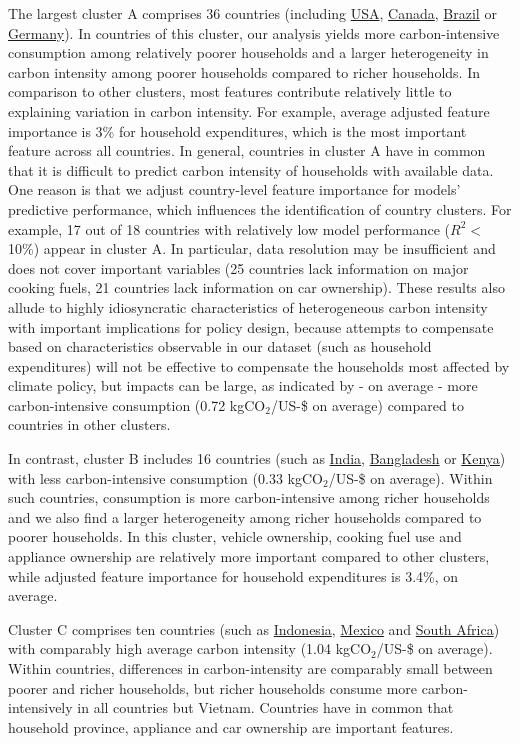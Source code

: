 \documentclass[12pt, a4paper]{article}
\begin{document}
The largest cluster A comprises 36 countries (including \hyperref[fig:5b_USA]{USA}, \hyperref[fig:5b_CAN]{Canada}, \hyperref[fig:5b_BRA]{Brazil} or \hyperref[fig:5b_DEU]{Germany}). In countries of this cluster, our analysis yields more carbon-intensive consumption among relatively poorer households and a larger heterogeneity in carbon intensity among poorer households compared to richer households. In comparison to other clusters, most features contribute relatively little to explaining variation in carbon intensity. For example, average adjusted feature importance is 3\% for household expenditures, which is the most important feature across all countries. In general, countries in cluster A have in common that it is difficult to predict carbon intensity of households with available data. One reason is that we adjust country-level feature importance for models' predictive performance, which influences the identification of country clusters. For example, 17 out of 18 countries with relatively low model performance ($R^{2}<$10\%) appear in cluster A. In particular, data resolution may be insufficient and does not cover important variables (25 countries lack information on major cooking fuels, 21 countries lack information on car ownership). These results also allude to highly idiosyncratic characteristics of heterogeneous carbon intensity with important implications for policy design, because attempts to compensate based on characteristics observable in our dataset (such as household expenditures) will not be effective to compensate the households most affected by climate policy, but impacts can be large, as indicated by - on average - more carbon-intensive consumption (0.72 kgCO$_{2}$/US-\$ on average) compared to countries in other clusters. 

In contrast, cluster B includes 16 countries (such as \hyperref[fig:5b_IND]{India}, \hyperref[fig:5b_BGD]{Bangladesh} or \hyperref[fig:5b_KEN]{Kenya}) with less carbon-intensive consumption (0.33 kgCO$_{2}$/US-\$ on average). Within such countries, consumption is more carbon-intensive among richer households and we also find a larger heterogeneity among richer households compared to poorer households. In this cluster, vehicle ownership, cooking fuel use and appliance ownership are relatively more important compared to other clusters, while adjusted feature importance for household expenditures is 3.4\%, on average.

Cluster C comprises ten countries (such as \hyperref[fig:5b_IDN]{Indonesia}, \hyperref[fig:5b_MEX]{Mexico} and \hyperref[fig:5b_ZAF]{South Africa}) with comparably high average carbon intensity (1.04 kgCO$_{2}$/US-\$ on average). Within countries, differences in carbon-intensity are comparably small between poorer and richer households, but richer households consume more carbon-intensively in all countries but Vietnam. Countries have in common that household province, appliance and car ownership are important features.
\end{document}
